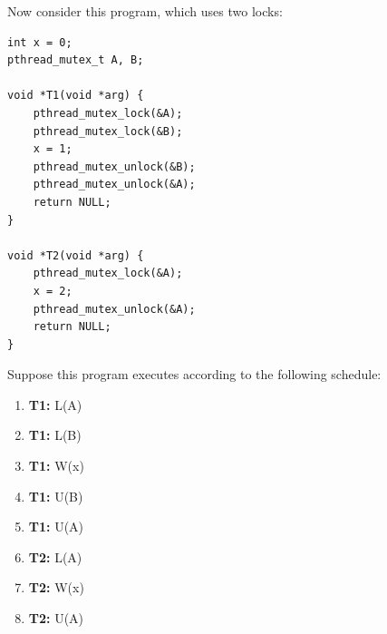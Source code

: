 \documentclass[addpoints]{exam}
\newcommand{\nonAnswerNewPage}{\ifprintanswers \vfill \else \newpage \fi}
\newcommand{\LS}[1]{\texttt{\{#1\}}}
\begin{document}
\begin{questions}
\nonAnswerNewPage

\question Now consider this program, which uses two locks:

\begin{verbatim}
int x = 0;
pthread_mutex_t A, B;

void *T1(void *arg) {
    pthread_mutex_lock(&A);
    pthread_mutex_lock(&B);
    x = 1;
    pthread_mutex_unlock(&B);
    pthread_mutex_unlock(&A);
    return NULL;
}

void *T2(void *arg) {
    pthread_mutex_lock(&A);
    x = 2;
    pthread_mutex_unlock(&A);
    return NULL;
}
\end{verbatim}

  Suppose this program executes according to the following schedule:
  \begin{enumerate}
  \item \textbf{T1:} L(A)
  \item \textbf{T1:} L(B)
  \item \textbf{T1:} W(x)
  \item \textbf{T1:} U(B)
  \item \textbf{T1:} U(A)
  \item \textbf{T2:} L(A)
  \item \textbf{T2:} W(x)
  \item \textbf{T2:} U(A)
  \end{enumerate}

\end{questions}
\end{document}
